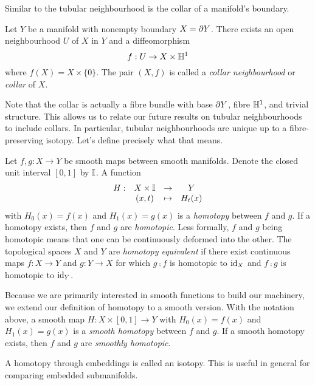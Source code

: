 Similar to the tubular neighbourhood is the collar of a manifold's boundary.

\begin{prop}[Collar]
	\label{defthm:collar}
	Let $Y$ be a manifold with nonempty boundary $X = \partial Y$.
	There exists an open neighbourhood $U$ of $X$ in $Y$ and a diffeomorphism
	\[
	f: U \to X\times\mathbb{H}^1
	\]
	where $f(X)=X\times \{0\}$.
	The pair $(X,f)$ is called a \emph{collar neighbourhood} or \emph{collar} of $X$.	
\end{prop}

Note that the collar is actually a fibre bundle with base $\partial Y$, fibre $\mathbb{H}^1$, and trivial structure.
This allows us to relate our future results on tubular neighbourhoods to include collars.
In particular, tubular neighbourhoods are unique up to a fibre-preserving isotopy.
Let's define precisely what that means.

\begin{defn}[Homotopy]
	\label{def:homotopy}
	Let $f,g:X\to Y$ be smooth maps between smooth manifolds.
	Denote the closed unit interval $[0,1]$ by $\mathbb{I}$.
	A function 
	\[
		\begin{array}{cccc}
			H: & X\times \mathbb{I} & \to & Y \\
			   & (x,t)	& \mapsto & H_t(x)
		\end{array}
	\]
	with $H_0(x)=f(x)$ and $H_1(x)=g(x)$ is a \emph{homotopy} between $f$ and $g$.
	If a homotopy exists, then $f$ and $g$ are \emph{homotopic}.
	Less formally, $f$ and $g$ being homotopic means that one can be continuously deformed into the other.
	The topological spaces $X$ and $Y$ are \emph{homotopy equivalent} if there exist continuous maps $f:X\to Y$ and $g:Y\to X$ for which $g\comp f$ is homotopic to $\textrm{id}_{X}$ and $f\comp g$ is homotopic to $\textrm{id}_{Y}$.
	
	Because we are primarily interested in smooth functions to build our machinery, we extend our definition of homotopy to a smooth version.
	With the notation above, a smooth map $H:X\times[0,1]\to Y$ with $H_0(x)=f(x)$ and $H_1(x)=g(x)$ is a \emph{smooth homotopy} between $f$ and $g$.
	If a smooth homotopy exists, then $f$ and $g$ are \emph{smoothly homotopic}.
\end{defn}

A homotopy through embeddings is called an isotopy.
This is useful in general for comparing embedded submanifolds.

